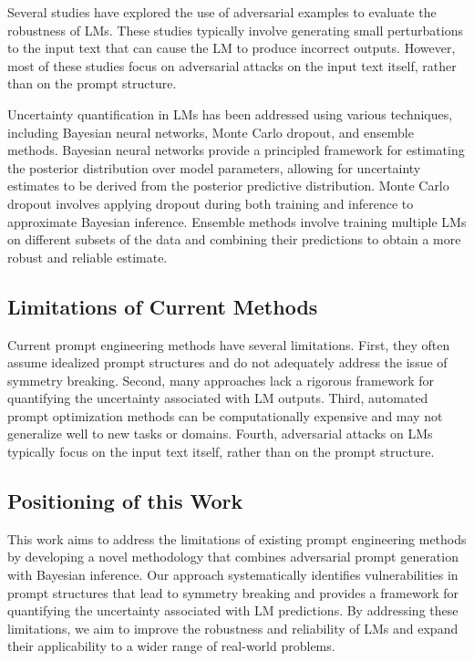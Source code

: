 \documentclass{article}
\begin{document}
Several studies have explored the use of adversarial examples to evaluate the robustness of LMs. These studies typically involve generating small perturbations to the input text that can cause the LM to produce incorrect outputs. However, most of these studies focus on adversarial attacks on the input text itself, rather than on the prompt structure.

Uncertainty quantification in LMs has been addressed using various techniques, including Bayesian neural networks, Monte Carlo dropout, and ensemble methods. Bayesian neural networks provide a principled framework for estimating the posterior distribution over model parameters, allowing for uncertainty estimates to be derived from the posterior predictive distribution. Monte Carlo dropout involves applying dropout during both training and inference to approximate Bayesian inference. Ensemble methods involve training multiple LMs on different subsets of the data and combining their predictions to obtain a more robust and reliable estimate.

\subsection{Limitations of Current Methods}
Current prompt engineering methods have several limitations. First, they often assume idealized prompt structures and do not adequately address the issue of symmetry breaking. Second, many approaches lack a rigorous framework for quantifying the uncertainty associated with LM outputs. Third, automated prompt optimization methods can be computationally expensive and may not generalize well to new tasks or domains. Fourth, adversarial attacks on LMs typically focus on the input text itself, rather than on the prompt structure.

\subsection{Positioning of this Work}
This work aims to address the limitations of existing prompt engineering methods by developing a novel methodology that combines adversarial prompt generation with Bayesian inference. Our approach systematically identifies vulnerabilities in prompt structures that lead to symmetry breaking and provides a framework for quantifying the uncertainty associated with LM predictions. By addressing these limitations, we aim to improve the robustness and reliability of LMs and expand their applicability to a wider range of real-world problems.
\end{document}
